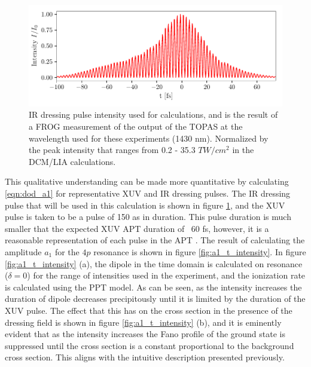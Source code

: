 \begin{figure}
	\centering
	\includegraphics[width=1.0\textwidth]{figures/ATS/fields.pdf}
	\caption[IR dressing pulse used in DCM/LIA calculations]{IR dressing pulse intensity used for calculations, and is the result of a FROG measurement of the output of the TOPAS at the wavelength used for these experiments (1430 nm). Normalized by the peak intensity that ranges from 0.2 - 35.3 $TW/cm^2$ in the DCM/LIA calculations.}
	\label{fig:fields}
\end{figure}

This qualitative understanding can be made more quantitative by calculating \ref{eqn:dod_a1} for representative XUV and IR dressing pulses.  The IR dressing pulse that will be used in this calculation is shown in figure \ref{fig:fields}, and the XUV pulse is taken to be a pulse of 150 as in duration.  This pulse duration is much smaller that the expected XUV APT duration of ~60 fs, however, it is a reasonable representation of each pulse in the APT \cite{paulObservationTrainAttosecond2001, agostiniPhysicsAttosecondLight2004, orfanosAttosecondPulseMetrology2019, chirlaAttosecondPulseGeneration2011}.  The result of calculating the amplitude $a_1$ for the $4p$ resonance is shown in figure \ref{fig:a1_t_intensity}. In figure \ref{fig:a1_t_intensity} (a), the dipole in the time domain is calculated on resonance ($\delta=0$) for the range of intensities used in the experiment, and the ionization rate is calculated using the PPT model.  As can be seen, as the intensity increases the duration of dipole decreases precipitously until it is limited by the duration of the XUV pulse. The effect that this has on the cross section in the presence of the dressing field is shown in figure \ref{fig:a1_t_intensity} (b), and it is eminently evident that as the intensity increases the Fano profile of the ground state is suppressed until the cross section is a constant proportional to the background cross section.  This aligns with the intuitive description presented previously.  

